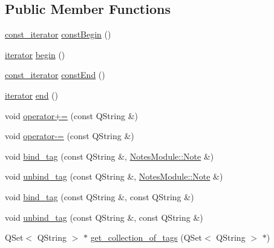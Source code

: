\subsection*{Public Member Functions}
\begin{DoxyCompactItemize}
\item 
\hyperlink{classmanagers_1_1_tags_manager_a6f717302ace6d00a4b8b97b60fa596f8}{const\-\_\-iterator} \hyperlink{classmanagers_1_1_tags_manager_ac21785b99cd30cdea183a604cd5c0d86}{const\-Begin} ()
\item 
\hyperlink{classmanagers_1_1_tags_manager_a7064c805f49f35cd2508b420b3bf00ed}{iterator} \hyperlink{classmanagers_1_1_tags_manager_a66233b3ddb4caf56eb3768c2f23ce9b5}{begin} ()
\item 
\hyperlink{classmanagers_1_1_tags_manager_a6f717302ace6d00a4b8b97b60fa596f8}{const\-\_\-iterator} \hyperlink{classmanagers_1_1_tags_manager_aa088102ea60f93a80ee8f3f5412e8f28}{const\-End} ()
\item 
\hyperlink{classmanagers_1_1_tags_manager_a7064c805f49f35cd2508b420b3bf00ed}{iterator} \hyperlink{classmanagers_1_1_tags_manager_a55e7bec26f70a038c8c296c83a8ef3a1}{end} ()
\item 
void \hyperlink{classmanagers_1_1_tags_manager_add89da08be2a26d0669766b34c65ebc2}{operator+=} (const Q\-String \&)
\item 
void \hyperlink{classmanagers_1_1_tags_manager_ae769ad392e49d2f1b81606a89ab457cc}{operator-\/=} (const Q\-String \&)
\item 
void \hyperlink{classmanagers_1_1_tags_manager_a21e100cdad6069c98f9ece117bf532d4}{bind\-\_\-tag} (const Q\-String \&, \hyperlink{class_notes_module_1_1_note}{Notes\-Module\-::\-Note} \&)
\item 
void \hyperlink{classmanagers_1_1_tags_manager_a2eb86477e32b09f3241bc38eadbe166a}{unbind\-\_\-tag} (const Q\-String \&, \hyperlink{class_notes_module_1_1_note}{Notes\-Module\-::\-Note} \&)
\item 
void \hyperlink{classmanagers_1_1_tags_manager_a73e69fdf06fce0a363a8131f91d644cb}{bind\-\_\-tag} (const Q\-String \&, const Q\-String \&)
\item 
void \hyperlink{classmanagers_1_1_tags_manager_a7dea75f62a27dc3cf139bd54292cb780}{unbind\-\_\-tag} (const Q\-String \&, const Q\-String \&)
\item 
Q\-Set$<$ Q\-String $>$ $\ast$ \hyperlink{classmanagers_1_1_tags_manager_a84f5328b5f8c81e6ba9e4a2f1cf94437}{get\-\_\-collection\-\_\-of\-\_\-tags} (Q\-Set$<$ Q\-String $>$ $\ast$)
\item 

\end{DoxyCompactItemize}
